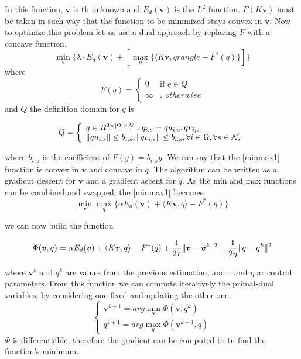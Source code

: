 \documentclass[12pt,a4paper,twoside]{report}
\begin{document}
{In this function, $\boldsymbol{v}$ is th unknown and $E_d(\boldsymbol{v})$ is the $L^2$ function. $F(K\boldsymbol{v})$ must be taken in such way that the function to be minimized stays convex in $\boldsymbol{v}$. Now to optimize this problem let us use a dual approach by replacing $F$ with a concave function. 
$$ \label{minmax1}
 \min_{\boldsymbol{v}} \{\lambda \cdot E_d(\boldsymbol{v})+ 
[\max_q\{\langle K\boldsymbol{v}, q rangle - F^*(q)\}]
\}$$
where
\begin{equation} 
F(q) =
\left\{
\begin{array}{ll}
0  & \mbox{if } q \in Q \\
\infty  & , \  otherwise
\end{array}
\right.
\end{equation}
and $Q$ the definition domain for $q$ is 

\begin{equation} \label{qconstraints}
Q =
\left\{
\begin{array}{ll}
q \in R^{2\times|\Omega|\times \mathcal{N}} : q_{i,s} = qu_{i,s}, qv_{i,s} \\
\Arrowvert qu_{i,s}\Arrowvert \leq b_{i,s}, \Arrowvert qv_{i,s}\Arrowvert \leq b_{i,s} , \forall i \in \Omega, \forall s \in \mathcal{N}_i 
\end{array}
\right.
\end{equation}

where $b_{i,s}$ is the coefficient of $F(y) = b_{i,s}y$. 
We can say that the \ref{minmax1} function is convex in $\boldsymbol{v}$ and concave in $q$. The algorithm can be written as a gradient descent for $\boldsymbol{v}$ and a gradient ascent for $q$.
As the min and max functions can be combined and swapped, the \ref{minmax1} becomes
$$
\min_{\boldsymbol{v}} \max_{q} \{\alpha E_d(\boldsymbol{v})+\langle K\boldsymbol{v}, q \rangle - F^*(q)\}
$$

we can now build the function 

$$
\Phi(\boldsymbol{v}, q) = \alpha E_d(\boldsymbol{v})+\langle K\boldsymbol{v}, q \rangle - F^*(q) + \frac{1}{2\tau} \Arrowvert \boldsymbol{v} - \boldsymbol{v}^k \Arrowvert^2 -  \frac{1}{2\eta} \Arrowvert {q} - {q}^k \Arrowvert^2
$$

where $\boldsymbol{v}^k$ and $q^k$ are values from the previous estimation, and $\tau$ and $\eta$ ar control parameters. From this function we can compute iteratively the primal-dual variables, by considering one fixed and updating the other one.
$$
\left\{
\begin{array}{ll}
\boldsymbol{v}^{k+1}  = arg \min_{\boldsymbol{v}} \Phi(\boldsymbol{v}, q^k)  \\
q^{k+1}  = arg \max_q \Phi(\boldsymbol{v}^{k+1}, q)
\end{array}
\right.
$$
$\Phi$ is differentiable, therefore the gradient can be computed to tu find the function's minimum.

}
\end{document}
